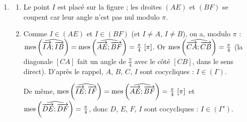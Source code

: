 \begin{description}
\begin{enumerate}
\begin{enumerate}
		\end{enumerate}
		\item
		\begin{enumerate}
			\item Le point $I$ est placé sur la figure ; les droites $(AE)$ et $(BF)$ se coupent car leur angle n'est pas nul modulo $\pi$.
			\item {}
				Comme $I \in (AE)$ et $I \in (BF)$ (et $I \neq A$, $I \neq B$), on a, modulo $\pi$ :
				$\mathrm{mes}\left( \widehat{ \overrightarrow{IA} ; \overrightarrow{IB} } \right) = \mathrm{mes}\left( \widehat{ \overrightarrow{AE} ; \overrightarrow{BF} } \right) = \frac{\pi}{4} \ [\pi]$.
				Or $\mathrm{mes}\left( \widehat{ \overrightarrow{CA} ; \overrightarrow{CB} } \right) = \frac{\pi}{4}$ (la diagonale $[CA]$ fait un angle de $\frac{\pi}{4}$ avec le côté $[CB]$, dans le sens direct). D'après le rappel,
				$A$, $B$, $C$, $I$ sont cocycliques : $I \in (\Gamma)$.

				De même, $\mathrm{mes}\left( \widehat{ \overrightarrow{IE} ; \overrightarrow{IF} } \right) = \mathrm{mes}\left( \widehat{ \overrightarrow{AE} ; \overrightarrow{BF} } \right) = \frac{\pi}{4} \ [\pi]$ et $\mathrm{mes}\left( \widehat{ \overrightarrow{DE} ; \overrightarrow{DF} } \right) = \frac{\pi}{4}$, donc $D$, $E$, $F$, $I$ sont cocycliques : $I \in (\Gamma')$.


\end{enumerate}
\end{enumerate}
\end{description}
